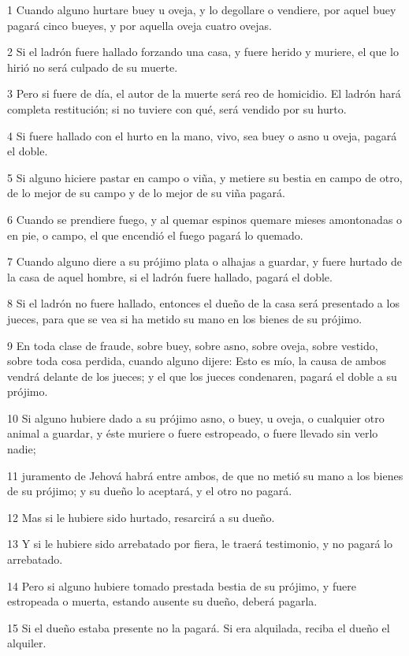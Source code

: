\par 1 Cuando alguno hurtare buey u oveja, y lo degollare o vendiere, por aquel buey pagará cinco bueyes, y por aquella oveja cuatro ovejas.
\par 2 Si el ladrón fuere hallado forzando una casa, y fuere herido y muriere, el que lo hirió no será culpado de su muerte.
\par 3 Pero si fuere de día, el autor de la muerte será reo de homicidio. El ladrón hará completa restitución; si no tuviere con qué, será vendido por su hurto.
\par 4 Si fuere hallado con el hurto en la mano, vivo, sea buey o asno u oveja, pagará el doble.
\par 5 Si alguno hiciere pastar en campo o viña, y metiere su bestia en campo de otro, de lo mejor de su campo y de lo mejor de su viña pagará.
\par 6 Cuando se prendiere fuego, y al quemar espinos quemare mieses amontonadas o en pie, o campo, el que encendió el fuego pagará lo quemado.
\par 7 Cuando alguno diere a su prójimo plata o alhajas a guardar, y fuere hurtado de la casa de aquel hombre, si el ladrón fuere hallado, pagará el doble.
\par 8 Si el ladrón no fuere hallado, entonces el dueño de la casa será presentado a los jueces, para que se vea si ha metido su mano en los bienes de su prójimo.
\par 9 En toda clase de fraude, sobre buey, sobre asno, sobre oveja, sobre vestido, sobre toda cosa perdida, cuando alguno dijere: Esto es mío, la causa de ambos vendrá delante de los jueces; y el que los jueces condenaren, pagará el doble a su prójimo.
\par 10 Si alguno hubiere dado a su prójimo asno, o buey, u oveja, o cualquier otro animal a guardar, y éste muriere o fuere estropeado, o fuere llevado sin verlo nadie;
\par 11 juramento de Jehová habrá entre ambos, de que no metió su mano a los bienes de su prójimo; y su dueño lo aceptará, y el otro no pagará.
\par 12 Mas si le hubiere sido hurtado, resarcirá a su dueño.
\par 13 Y si le hubiere sido arrebatado por fiera, le traerá testimonio, y no pagará lo arrebatado.
\par 14 Pero si alguno hubiere tomado prestada bestia de su prójimo, y fuere estropeada o muerta, estando ausente su dueño, deberá pagarla.
\par 15 Si el dueño estaba presente no la pagará. Si era alquilada, reciba el dueño el alquiler.


